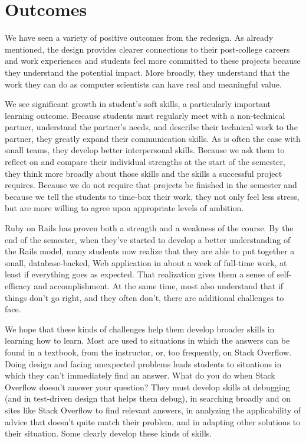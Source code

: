 \section{Outcomes}

We have seen a variety of positive outcomes from the redesign.  As
already mentioned, the design provides clearer connections to their
post-college careers and work experiences and students feel more
committed to these projects because they understand the potential
impact.  More broadly, they understand that the work they can do
as computer scientists can have real and meaningful value.

We see significant growth in student's soft skills, a particularly
important learning outcome.
Because students must regularly meet with a
non-technical partner, understand the partner's needs, and
describe their technical work to the partner,
they greatly expand their communication skills.
As is often the case with small teams, they develop better interpersonal
skills.  Because we ask them to reflect on and compare their individual
strengths at the start of the semester,
they think more broadly
about those skills and the skills a successful
project requires.  
Because we do
not require that projects be finished in the semester and because
we tell the students to time-box their work, they not only feel
less stress, but are more willing to agree upon appropriate levels
of ambition. 

Ruby on Rails has proven both a strength and a weakness
of the course.  By the end of the semester, when they've started to develop
a better understanding of the Rails model, many students now realize that they 
are able to put together a small, database-backed, Web application
in about a week of full-time work, at least if everything goes as
expected.  
That realization gives them a sense of self-efficacy
and accomplishment.  At the same time, most also understand that if things
don't go right, and they often don't, there are additional challenges
to face.

We hope that these kinds of challenges help them develop broader
skills in learning how to learn.  Most are used to situations in
which the answers can be found in a textbook, from the instructor,
or, too frequently, on Stack Overflow.  Doing design and facing 
unexpected problems leads students to situations in
which they can't immediately find an answer.  What do you do when
Stack Overflow doesn't answer your question?  They must develop skills
at debugging (and in test-driven design that helps them
debug), in searching broadly and on sites like Stack Overflow
to find relevant answers, in analyzing the applicability of advice
that doesn't quite match their problem, and in adapting other
solutions to their situation.  Some clearly develop these kinds
of skills.  

